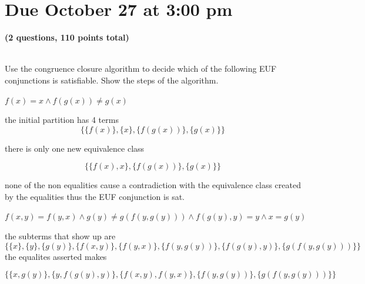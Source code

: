 \documentclass[11pt]{article}
\begin{document}
\maketitle

\section*{Due October 27 at 3:00 pm}

\textbf{(2 questions, 110 points total)}

\begin{qunlist}

  \\
  Use the congruence closure algorithm to decide which of the following EUF conjunctions is satisfiable.
  Show the steps of the algorithm.
  \begin{qparts}
  \item
    $f(x) = x \land f(g(x)) \ne g(x)$

    \begin{answer}
      the initial partition has 4 terms
      \begin{equation}
        \{\{f(x)\},\{x\},\{f(g(x))\},\{g(x)\}\}
      \end{equation}

      there is only one new equivalence class

      \begin{equation}
        \{\{f(x),x\},\{f(g(x))\},\{g(x)\}\}
      \end{equation}

      none of the non equalities cause a contradiction with the equivalence class created by the equalities thus the EUF conjunction is sat.

    \end{answer}

  \item
    $f(x,y) = f(y,x) \land g(y) \ne g(f(y, g(y))) \land f(g(y), y) = y \land x = g(y)$

    \begin{answer}
      the subterms that show up are
      \begin{equation}
        \{\{x\}, \{y\}, \{g(y)\}, \{f(x,y)\}, \{f(y,x)\}, \{f(y, g(y))\}, \{f(g(y), y)\}, \{g(f(y, g(y)))\}\}
      \end{equation}
      the equalites asserted makes

      \begin{equation}
        \{\{x, g(y)\}, \{y, f(g(y), y)\}, \{f(x,y), f(y,x)\}, \{f(y, g(y))\}, \{g(f(y, g(y)))\}\}
      \end{equation}


\end{answer}
\end{qparts}
\end{qunlist}
\end{document}
